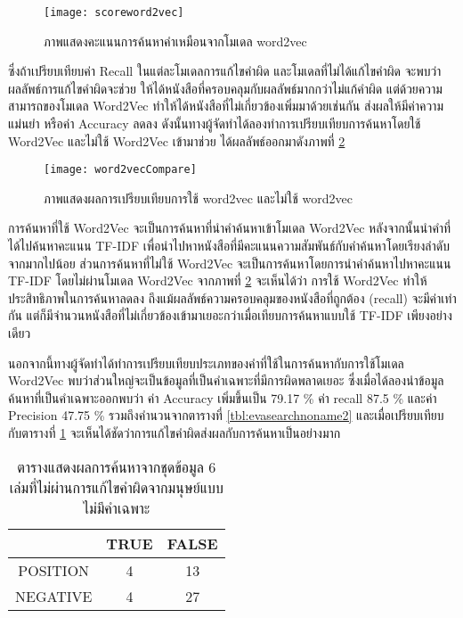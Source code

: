 \begin{figure}[H]
    \centering
    \texttt{[image: scoreword2vec]}
    \caption{ภาพแสดงคะแนนการค้นหาคำเหมือนจากโมเดล word2vec}\label{fig:scoreword2vec}
\end{figure}


ซึ่งถ้าเปรียบเทียบค่า Recall ในแต่ละโมเดลการแก้ไขคำผิด และโมเดลที่ไม่ได้แก้ไขคำผิด จะพบว่าผลลัพธ์การแก้ไขคำผิดจะช่วย
ให้ได้หนังสือที่ครอบคลุมกับผลลัพธ์มากกว่าไม่แก้คำผิด แต่ด้วยความสามารถของโมเดล 
Word2Vec ทำให้ได้หนังสือที่ไม่เกี่ยวข้องเพิ่มมาด้วยเช่นกัน ส่งผลให้มีค่าความแม่นยำ 
หรือค่า Accuracy ลดลง ดังนั้นทางผู้จัดทำได้ลองทำการเปรียบเทียบการค้นหาโดยใช้ 
Word2Vec และไม่ใช้ Word2Vec เข้ามาช่วย ได้ผลลัพธ์ออกมาดังภาพที่ \ref{fig:word2vecCompare}

\begin{figure}[H]
    \centering
    \texttt{[image: word2vecCompare]}
    \caption{ภาพแสดงผลการเปรียบเทียบการใช้ word2vec และไม่ใช้ word2vec}\label{fig:word2vecCompare}
\end{figure}

การค้นหาที่ใช้ Word2Vec จะเป็นการค้นหาที่นำคำค้นหาเข้าโมเดล Word2Vec หลังจากนั้นนำคำที่ได้ไปค้นหาคะแนน TF-IDF เพื่อนำไปหาหนังสือที่มีคะแนนความสัมพันธ์กับคำค้นหาโดยเรียงลำดับจากมากไปน้อย 
ส่วนการค้นหาที่ไม่ใช้ Word2Vec จะเป็นการค้นหาโดยการนำคำค้นหาไปหาคะแนน TF-IDF โดยไม่ผ่านโมเดล Word2Vec
จากภาพที่ \ref{fig:word2vecCompare}  จะเห็นได้ว่า การใช้ Word2Vec ทำให้ประสิทธิภาพในการค้นหาลดลง ถึงแม้ผลลัพธ์ความครอบคลุมของหนังสือที่ถูกต้อง (recall) จะมีค่าเท่ากัน 
แต่ก็มีจำนวนหนังสือที่ไม่เกี่ยวข้องเข้ามาเยอะกว่าเมื่อเทียบการค้นหาแบบใช้ TF-IDF เพียงอย่างเดียว

นอกจากนี้ทางผู้จัดทำได้ทำการเปรียบเทียบประเภทของคำที่ใช้ในการค้นหากับการใช้โมเดล Word2Vec 
พบว่าส่วนใหญ่จะเป็นข้อมูลที่เป็นคำเฉพาะที่มีการผิดพลาดเยอะ
ซึ่งเมื่อได้ลองนำข้อมูลค้นหาที่เป็นคำเฉพาะออกพบว่า ค่า Accuracy เพิ่มขึ้นเป็น 79.17 \% ค่า recall 87.5 \% และค่า Precision 47.75 \% 
รวมถึงคำนวนจากตารางที่ \ref{tbl:evasearchnoname2} และเมื่อเปรียบเทียบกับตารางที่ \ref{tbl:evasearchnoname} จะเห็นได้ชัดว่าการแก้ไขคำผิดส่งผลกับการค้นหาเป็นอย่างมาก

\begin{table}[H]
    \caption{ตารางแสดงผลการค้นหาจากชุดข้อมูล 6 เล่มที่ไม่ผ่านการแก้ไขคำผิดจากมนุษย์แบบไม่มีคำเฉพาะ}\label{tbl:evasearchnoname}
    \begin{tabular}{|c|c|c|}
    \hline
                & TRUE & FALSE \\ \hline
    POSITION & 4   & 13   \\ \hline
    NEGATIVE & 4   & 27   \\ \hline
    \end{tabular}
    \end{table}

